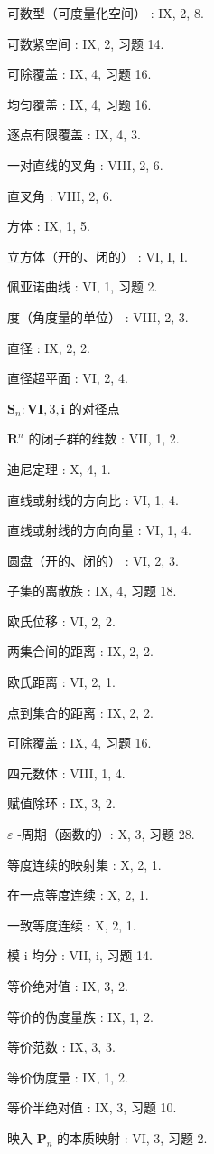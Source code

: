 可数型（可度量化空间） : IX, 2, 8.

可数紧空间 : IX, 2, 习题 14.

可除覆盖 : IX, 4, 习题 16.

均匀覆盖 : IX, 4, 习题 16.

逐点有限覆盖 : IX, 4, 3.

一对直线的叉角 : VIII, 2, 6.

直叉角 : VIII, 2, 6.

方体 : IX, 1, 5.

立方体（开的、闭的） : VI, I, I.

佩亚诺曲线 : VI, 1, 习题 2.

度（角度量的单位） : VIII, 2, 3.

直径 : IX, 2, 2.

直径超平面 : VI, 2, 4.

\(\mathbf{S}_n:\mathbf{VI},3,\mathbf{i}\) 的对径点

\(\mathbf{R}^n\) 的闭子群的维数 : VII, 1, 2.

迪尼定理 : X, 4, 1.

直线或射线的方向比 : VI, 1, 4.

直线或射线的方向向量 : VI, 1, 4.

圆盘（开的、闭的） : VI, 2, 3.

子集的离散族 : IX, 4, 习题 18.

欧氏位移 : VI, 2, 2.

两集合间的距离 : IX, 2, 2.

欧氏距离 : VI, 2, 1.

点到集合的距离 : IX, 2, 2.

可除覆盖 : IX, 4, 习题 16.

四元数体 : VIII, 1, 4.

赋值除环 : IX, 3, 2.

\(\varepsilon\) -周期（函数的）: X, 3, 习题 28.

等度连续的映射集 : X, 2, 1.

在一点等度连续 : X, 2, 1.

一致等度连续 : X, 2, 1.

模 i 均分 : VII, i, 习题 14.

等价绝对值 : IX, 3, 2.

等价的伪度量族 : IX, 1, 2.

等价范数 : IX, 3, 3.

等价伪度量 : IX, 1, 2.

等价半绝对值 : IX, 3, 习题 10.

映入 \(\mathbf{P}_n\) 的本质映射 : VI, 3, 习题 2.


